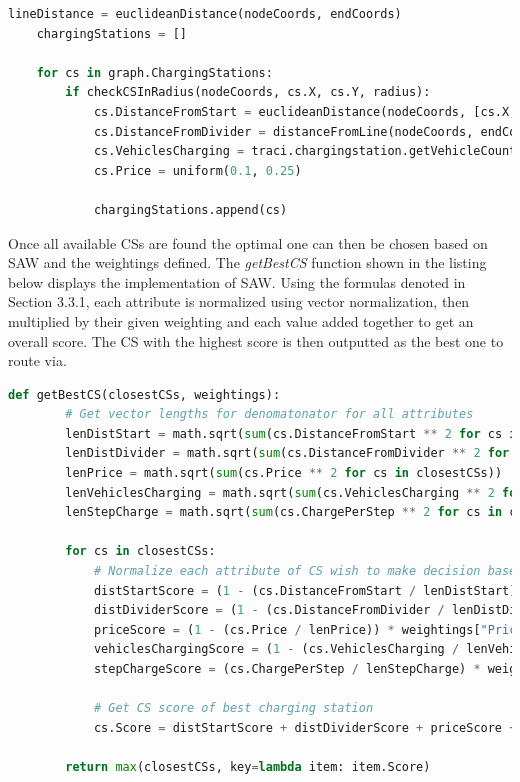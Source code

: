 \documentclass[11pt]{report}
\begin{document}
\begin{lstlisting}[language=Python, caption=Functionality for getting neighbouring CSs, label={lst:14}]
    lineDistance = euclideanDistance(nodeCoords, endCoords)
    chargingStations = []

    for cs in graph.ChargingStations:
        if checkCSInRadius(nodeCoords, cs.X, cs.Y, radius):
            cs.DistanceFromStart = euclideanDistance(nodeCoords, [cs.X, cs.Y])
            cs.DistanceFromDivider = distanceFromLine(nodeCoords, endCoords, [cs.X, cs.Y], lineDistance)
            cs.VehiclesCharging = traci.chargingstation.getVehicleCount(cs.id)
            cs.Price = uniform(0.1, 0.25)

            chargingStations.append(cs)
\end{lstlisting}

Once all available CSs are found the optimal one can then be chosen based on SAW and the weightings defined. The \emph{getBestCS} function shown in the listing below displays the implementation of SAW. Using the formulas denoted in Section 3.3.1, each attribute is normalized using vector normalization, then multiplied by their given weighting and each value added together to get an overall score. The CS with the highest score is then outputted as the best one to route via.

\begin{lstlisting}[language=Python, caption=Python function that uses SAW to find best CS, label={lst:15}]
    def getBestCS(closestCSs, weightings):
        # Get vector lengths for denomatonator for all attributes
        lenDistStart = math.sqrt(sum(cs.DistanceFromStart ** 2 for cs in closestCSs))
        lenDistDivider = math.sqrt(sum(cs.DistanceFromDivider ** 2 for cs in closestCSs))
        lenPrice = math.sqrt(sum(cs.Price ** 2 for cs in closestCSs))
        lenVehiclesCharging = math.sqrt(sum(cs.VehiclesCharging ** 2 for cs in closestCSs))
        lenStepCharge = math.sqrt(sum(cs.ChargePerStep ** 2 for cs in closestCSs))
    
        for cs in closestCSs:
            # Normalize each attribute of CS wish to make decision based on and  its weighting
            distStartScore = (1 - (cs.DistanceFromStart / lenDistStart)) * weightings["DistanceFromStart"]
            distDividerScore = (1 - (cs.DistanceFromDivider / lenDistDivider)) * weightings["DistanceFromDivider"]
            priceScore = (1 - (cs.Price / lenPrice)) * weightings["Price"]
            vehiclesChargingScore = (1 - (cs.VehiclesCharging / lenVehiclesCharging)) * weightings["VehiclesCharging"]
            stepChargeScore = (cs.ChargePerStep / lenStepCharge) * weightings["ChargePerStep"]
    
            # Get CS score of best charging station
            cs.Score = distStartScore + distDividerScore + priceScore + stepChargeScore + vehiclesChargingScore

        return max(closestCSs, key=lambda item: item.Score)
\end{lstlisting}
\end{document}

